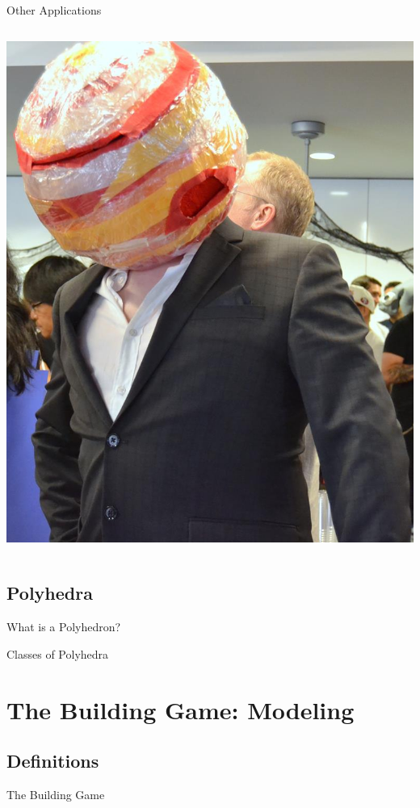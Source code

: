 \documentclass{beamer}
\begin{document}
\begin{frame}{Other Applications}
\begin{columns}
\begin{column}{0.48\textwidth}
{        \includegraphics{mr_jupiter.jpg}
}
    \end{column}
\end{columns}
\end{frame}

\subsection{Polyhedra}
\begin{frame}{What is a Polyhedron?}
\end{frame}
\begin{frame}{Classes of Polyhedra}
\end{frame}


\section{The Building Game: Modeling}
\subsection{Definitions}
\begin{frame}{The Building Game}
\end{frame}
\end{document}
